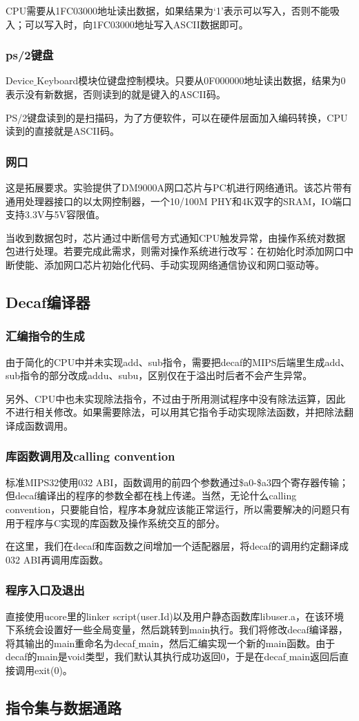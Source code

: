 CPU需要从1FC03000地址读出数据，如果结果为‘1’表示可以写入，否则不能吸入；可以写入时，向1FC03000地址写入ASCII数据即可。
\subsubsection{ps/2键盘}
Device$\_$Keyboard模块位键盘控制模块。只要从0F000000地址读出数据，结果为0表示没有新数据，否则读到的就是键入的ASCII码。

PS/2键盘读到的是扫描码，为了方便软件，可以在硬件层面加入编码转换，CPU读到的直接就是ASCII码。
\subsubsection{网口}
这是拓展要求。实验提供了DM9000A网口芯片与PC机进行网络通讯。该芯片带有通用处理器接口的以太网控制器，一个10/100M PHY和4K双字的SRAM，IO端口支持3.3V与5V容限值。

当收到数据包时，芯片通过中断信号方式通知CPU触发异常，由操作系统对数据包进行处理。若要完成此需求，则需对操作系统进行改写：在初始化时添加网口中断使能、添加网口芯片初始化代码、手动实现网络通信协议和网口驱动等。
\subsection{Decaf编译器}
\subsubsection{汇编指令的生成}
由于简化的CPU中并未实现add、sub指令，需要把decaf的MIPS后端里生成add、sub指令的部分改成addu、subu，区别仅在于溢出时后者不会产生异常。

另外、CPU中也未实现除法指令，不过由于所用测试程序中没有除法运算，因此不进行相关修改。如果需要除法，可以用其它指令手动实现除法函数，并把除法翻译成函数调用。
\subsubsection{库函数调用及calling convention}
标准MIPS32使用032 ABI，函数调用的前四个参数通过\$a0-\$a3四个寄存器传输；但decaf编译出的程序的参数全都在栈上传递。当然，无论什么calling convention，只要能自恰，程序本身就应该能正常运行，所以需要解决的问题只有用于程序与C实现的库函数及操作系统交互的部分。

在这里，我们在decaf和库函数之间增加一个适配器层，将decaf的调用约定翻译成032 ABI再调用库函数。
\subsubsection{程序入口及退出}
直接使用ucore里的linker script(user.Id)以及用户静态函数库libuser.a，在该环境下系统会设置好一些全局变量，然后跳转到main执行。我们将修改decaf编译器，将其输出的main重命名为decaf$\_$main，然后汇编实现一个新的main函数。由于decaf的main是void类型，我们默认其执行成功返回0，于是在decaf$\_$main返回后直接调用exit(0)。
\subsection{指令集与数据通路}
